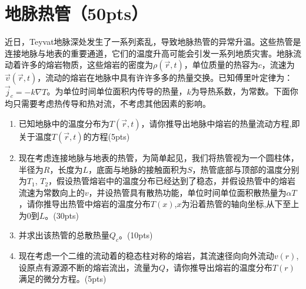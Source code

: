 \section{地脉热管（50pts）}
近日，Teyvat地脉深处发生了一系列紊乱，导致地脉热管的异常升温。这些热管是连接地脉与地表的重要通道，它们的温度升高可能会引发一系列地质灾害。地脉流动着许多的熔岩物质，这些熔岩的密度为\(\rho(\vec{r},t)\)，单位质量的热容为\(c\)，流速为\(\vec{v}(\vec{r},t)\)，流动的熔岩在地脉中具有许许多多的热量交换。已知傅里叶定律为：\(\vec{j}_c = -k \nabla T\)。为单位时间单位面积内传导的热量，\(k\)为导热系数，为常数。下面你均只需要考虑热传导和热对流，不考虑其他因素的影响。
\begin{enumerate}
	\item 已知地脉中的温度分布为\(T(\vec{r},t)\)，请你推导出地脉中熔岩的热量流动方程,即关于温度\(T(\vec{r},t)\)的方程(5pts)
	\item 现在考虑连接地脉与地表的热管，为简单起见，我们将热管视为一个圆柱体，半径为\(R\)，长度为\(L\)，底面与地脉的接触面积为\(S\)，热管底部与顶部的温度分别为\(T_1\), \(T_2\)，假设热管熔岩中的温度分布已经达到了稳态，并假设热管中的熔岩流速为常数向上的\(v\)，并设热管具有散热功能，单位时间单位面积散热量为\(\alpha T\)，请你推导出热管中熔岩的温度分布\(T(x)\),\(x\)为沿着热管的轴向坐标,从下至上为\(0\)到\(L\)。(30pts)
	\item 并求出该热管的总散热量\(Q_c\)。(10pts)
	\item 现在考虑一个二维的流动着的稳态柱对称的熔岩，其流速径向向外流动\(v(r)\),设原点有源源不断的熔岩流出，流量为\(Q\)，请你推导出熔岩的温度分布\(T(r)\)满足的微分方程。(5pts)
\end{enumerate}


